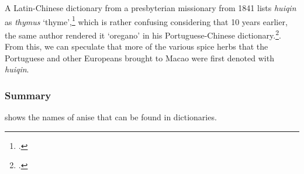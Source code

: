 A Latin-Chinese dictionary from a presbyterian missionary from 1841 lists \textit{huiqin} as \textit{thymus} `thyme',\footcite[715]{goncalves_lexicon_1841} which is rather confusing considering that 10 years earlier, the same author rendered it `oregano' in his Portuguese-Chinese dictionary.\footcite[585]{goncalves_diccionario_1831}. From this, we can speculate that more of the various spice herbs that the Portuguese and other Europeans brought to Macao were first denoted with \textit{huiqin}.



\subsubsection{Summary}

 shows the names of anise that can be found in dictionaries.



















